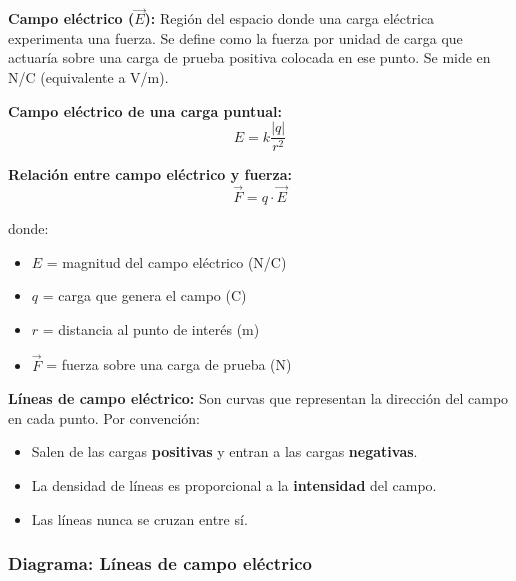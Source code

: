\begin{seccion}
\begin{definicion}
\textbf{Campo eléctrico ($\vec{E}$):} Región del espacio donde una carga eléctrica experimenta una fuerza. Se define como la fuerza por unidad de carga que actuaría sobre una carga de prueba positiva colocada en ese punto. Se mide en N/C (equivalente a V/m).
\end{definicion}

\begin{ecuacion}
\textbf{Campo eléctrico de una carga puntual:}
$$E = k \frac{|q|}{r^2}$$

\textbf{Relación entre campo eléctrico y fuerza:}
$$\vec{F} = q \cdot \vec{E}$$

donde:
\begin{itemize}
    \item $E$ = magnitud del campo eléctrico (N/C)
    \item $q$ = carga que genera el campo (C)
    \item $r$ = distancia al punto de interés (m)
    \item $\vec{F}$ = fuerza sobre una carga de prueba (N)
\end{itemize}
\end{ecuacion}

\textbf{Líneas de campo eléctrico:} Son curvas que representan la dirección del campo en cada punto. Por convención:
\begin{itemize}
    \item Salen de las cargas \textbf{positivas} y entran a las cargas \textbf{negativas}.
    \item La densidad de líneas es proporcional a la \textbf{intensidad} del campo.
    \item Las líneas nunca se cruzan entre sí.
\end{itemize}
\end{seccion}

\subsubsection{Diagrama: Líneas de campo eléctrico}

